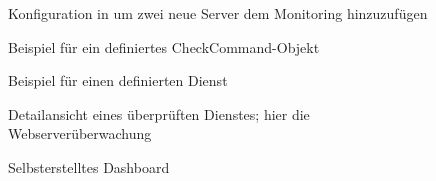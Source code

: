 \begin{figure}[!htb]
\centering
{}
\caption{Konfiguration in  um zwei neue Server dem Monitoring hinzuzufügen}
\label{screen:newservers}
\end{figure}

\begin{figure}[!htb]
\centering
{}
\caption{Beispiel für ein definiertes \glqq{}CheckCommand\grqq{}-Objekt}
\label{screen:loaddefinition}
\end{figure}

\begin{figure}[!htb]
\centering
{}
\caption{Beispiel für einen definierten Dienst}
\label{screen:service}
\end{figure}

\begin{figure}[!htb]
\centering
{}
\caption{Detailansicht eines überprüften Dienstes; hier die Webserverüberwachung}
\label{screen:webserver}
\end{figure}

\begin{figure}[!htb]
\centering
{}
\caption{Selbsterstelltes Dashboard}
\label{screen:dashboard}
\end{figure}
